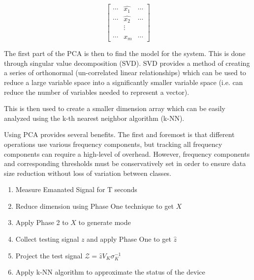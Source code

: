       \begin{equation}
        \label{eq:tpdr_phase_2_matrix}
        \begin{bmatrix}
          \cdots & \hat{x_1} & \cdots \\
          \cdots & \hat{x_2} & \cdots \\
                 & \vdots    &        \\
          \cdots & \hat{x_m} & \cdots
        \end{bmatrix}
      \end{equation}

      The first part of the PCA is then to find the model for the system.
      This is done through singular value decomposition (SVD).
      SVD provides a method of creating a series of orthonormal (un-correlated linear relationships) which can be used to reduce a 
        large variable space into a significantly smaller variable space (i.e. can reduce the number of variables needed to represent a vector).

      This is then used to create a smaller dimension array which can be easily analyzed using the k-th nearest neighbor algorithm (k-NN).

      Using PCA provides several benefits.
      The first and foremost is that different operations use various frequency components, 
        but tracking all frequency components can require a high-level of overhead.
      However, frequency components and corresponding  thresholds must be conservatively set in order to ensure
        data size reduction without loss of variation between classes.

      \begin{algobox}
        \label{algo:tpdr}
        \begin{enumerate}
          \item Measure Emanated Signal for T seconds
          \item Reduce dimension using Phase One technique to get $X$
          \item Apply Phase 2 to $X$ to generate mode
          \item Collect testing signal $z$ and apply Phase One to get $\hat{z}$
          \item Project the test signal $\mathcal{Z} = \hat{z} V_K \sigma_K^{-1}$
          \item Apply k-NN algorithm to approximate the status of the device
        \end{enumerate}
      \end{algobox}

